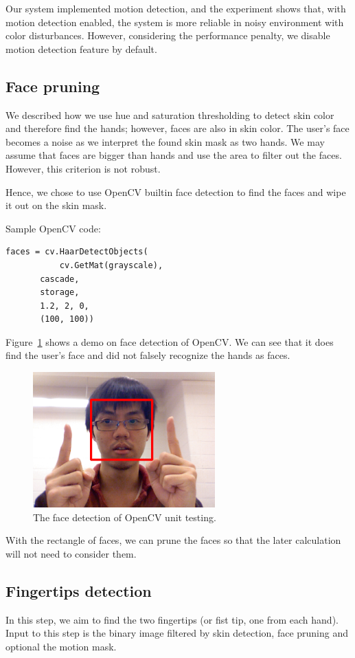 \documentclass[10pt,twocolumn,letterpaper]{article}
\begin{document}
Our system implemented motion detection, and 
the experiment shows that, with motion detection enabled, 
the system is more reliable in noisy environment with color 
disturbances. However, considering the performance penalty, we 
disable motion detection feature by default.

\subsection{Face pruning}
\label{sec:face}
We described how we use hue and saturation thresholding to detect skin
 color and therefore find the hands; however, faces are also in skin color. 
 The user's face becomes a noise as we interpret the found skin mask as 
 two hands. We may assume that faces are bigger than hands and use 
 the area to filter out the faces. However, this criterion is not robust. 

 Hence, we chose to use OpenCV builtin face detection to find the faces 
 and wipe it out on the skin mask.

Sample OpenCV code:
 \begin{verbatim}
faces = cv.HaarDetectObjects(
           cv.GetMat(grayscale), 
	   cascade, 
	   storage, 
	   1.2, 2, 0, 
	   (100, 100))
 \end{verbatim}

Figure~\ref{fig:facedetect} shows a demo on face detection of OpenCV. 
We can see that it does find the user's face and did not 
falsely recognize the hands as faces.

 \begin{figure}[h]
 \centering
 \includegraphics[width=7cm]{facedetection.png}
 \caption{The face detection of OpenCV unit testing. }
 \label{fig:facedetect}
 \end{figure}

With the rectangle of faces, we can prune the faces so that 
the later calculation will not need to consider them.


\subsection{Fingertips detection}
In this step, we aim to find the two fingertips (or fist tip, 
one from each hand). Input to this step is the binary image 
filtered by skin detection, face pruning and optional the motion mask.
\end{document}
